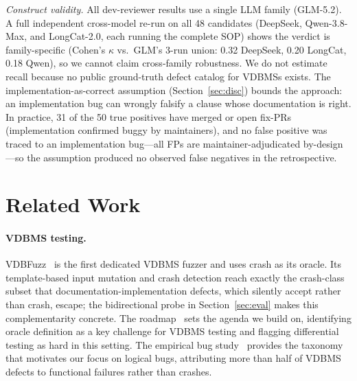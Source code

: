 \documentclass[sigconf]{acmart}
\begin{document}
\emph{Construct validity.} All dev-reviewer results use a single LLM family (GLM-5.2). A full independent cross-model re-run on all 48 candidates (DeepSeek, Qwen-3.8-Max, and LongCat-2.0, each running the complete SOP) shows the verdict is family-specific (Cohen's $\kappa$ vs.\ GLM's 3-run union: 0.32 DeepSeek, 0.20 LongCat, 0.18 Qwen), so we cannot claim cross-family robustness. We do not estimate recall because no public ground-truth defect catalog for VDBMSs exists. The implementation-as-correct assumption (Section~\ref{sec:disc}) bounds the approach: an implementation bug can wrongly falsify a clause whose documentation is right. In practice, 31 of the 50 true positives have merged or open fix-PRs (implementation confirmed buggy by maintainers), and no false positive was traced to an implementation bug---all FPs are maintainer-adjudicated by-design---so the assumption produced no observed false negatives in the retrospective.
\section{Related Work}
\label{sec:related}

\paragraph{VDBMS testing.}
VDBFuzz~\cite{vdbfuzz26} is the first dedicated VDBMS fuzzer and uses crash as its oracle. Its template-based input mutation and crash detection reach exactly the crash-class subset that documentation-implementation defects, which silently accept rather than crash, escape; the bidirectional probe in Section~\ref{sec:eval} makes this complementarity concrete. The roadmap~\cite{roadmap25} sets the agenda we build on, identifying oracle definition as a key challenge for VDBMS testing and flagging differential testing as hard in this setting. The empirical bug study~\cite{bugstudy25} provides the taxonomy that motivates our focus on logical bugs, attributing more than half of VDBMS defects to functional failures rather than crashes.
\end{document}
